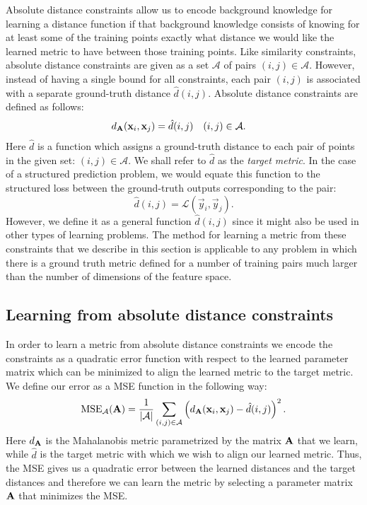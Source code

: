 Absolute distance constraints allow us to encode background knowledge for learning a distance function if that background knowledge consists of knowing for at least some of the training points exactly what distance we would like the learned metric to have between those training points. Like similarity constraints, absolute distance constraints are given as a set $\mathcal{A}$ of pairs $(i,j) \in \mathcal{A}$. However, instead of having a single bound for all constraints, each pair $(i,j)$ is associated with a separate ground-truth distance $\hat{d}(i,j)$. Absolute distance constraints are defined as follows: 
\begin{align}
d_{\mathbf{A}}(\mathbf{x}_i, \mathbf{x}_j) &= \hat{d}(i,j) & (i, j) &\in \mathcal{A}.
\end{align}
Here $\hat{d}$ is a function which assigns a ground-truth distance to each pair of points in the given set: $(i,j) \in \mathcal{A}$. We shall refer to $\hat{d}$ as the \emph{target metric}. In the case of a structured prediction problem, we would equate this function to the structured loss between the ground-truth outputs corresponding to the pair:
\begin{equation}
\hat{d}(i,j) = \mathcal{L}(\vec{y}_i, \vec{y}_j).
\end{equation}
However, we define it as a general function $\hat{d}(i,j)$ since it might also be used in other types of learning problems. The method for learning a metric from these constraints that we describe in this section is applicable to any problem in which there is a ground truth metric defined for a number of training pairs much larger than the number of dimensions of the feature space.



\subsection{Learning from absolute distance constraints}

In order to learn a metric from absolute distance constraints we encode the constraints as a quadratic error function with respect to the learned parameter matrix which can be minimized to align the learned metric to the target metric. We define our error as a \acf{MSE} function in the following way:
\begin{equation}
\text{MSE}_\mathcal{A}(\mathbf{A}) = \frac{1}{|\mathcal{A}|}\sum_{(i,j) \in \mathcal{A}} \left( d_{\mathbf{A}}(\mathbf{x}_i, \mathbf{x}_j) - \hat{d}(i,j) \right)^2.
\label{eq:mse}
\end{equation}
Here $d_{\mathbf{A}}$ is the Mahalanobis metric parametrized by the matrix $\mathbf{A}$ that we learn, while $\hat{d}$ is the target metric with which we wish to align our learned metric. Thus, the \ac{MSE} gives us a quadratic error between the learned distances and the target distances and therefore we can learn the metric by selecting a parameter matrix $\mathbf{A}$ that minimizes the \ac{MSE}.


